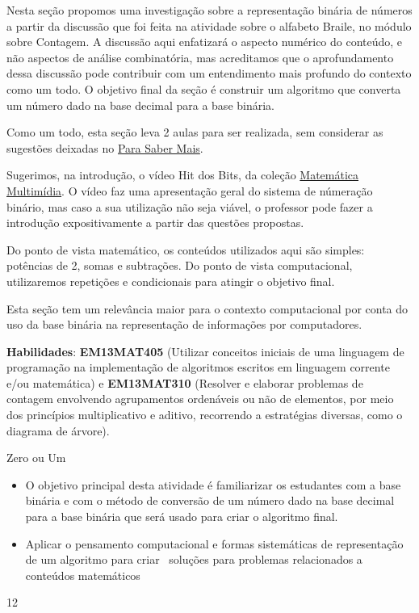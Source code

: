 \def\currentcolor{session1}
\begin{texto}
{
Nesta seção propomos uma investigação sobre a representação binária de números a partir da discussão que foi feita na atividade sobre o alfabeto Braile, no módulo sobre Contagem. A discussão aqui enfatizará o aspecto numérico do conteúdo, e não aspectos de análise combinatória, mas acreditamos que o aprofundamento dessa discussão pode contribuir com um entendimento mais profundo do contexto como um todo. O objetivo final da seção é construir um algoritmo que converta um número dado na base decimal para a base binária.

Como um todo, esta seção leva 2 aulas para ser realizada, sem considerar as sugestões deixadas no \hyperref[comp-know1]{Para Saber Mais}.

Sugerimos, na introdução, o vídeo Hit dos Bits, da coleção \href{https://m3.ime.unicamp.br/}{Matemática Multimídia}. O vídeo faz uma apresentação geral do sistema de númeração binário, mas caso a sua utilização não seja viável, o professor pode fazer a introdução expositivamente a partir das questões propostas.

Do ponto de vista matemático, os conteúdos utilizados aqui são simples: potências de 2, somas e subtrações. Do ponto de vista computacional, utilizaremos repetições e condicionais para atingir o objetivo final.

Esta seção tem um relevância maior para o contexto computacional por conta do uso da base binária na representação de informações por computadores.

\textbf{Habilidades}: \textbf{EM13MAT405} (Utilizar conceitos iniciais de uma linguagem de programação na implementação de algoritmos escritos em linguagem corrente e/ou matemática) e \textbf{EM13MAT310} (Resolver e elaborar problemas de contagem envolvendo agrupamentos ordenáveis ou não de elementos, por meio dos princípios multiplicativo e aditivo, recorrendo a estratégias diversas, como o diagrama de árvore).

}
\end{texto}
\clearmargin
\begin{objectives}{Zero ou Um}
{
\begin{itemize}
\item O objetivo principal desta atividade é familiarizar os estudantes com a base binária e com o método de conversão de um número dado na base decimal para a base binária que será usado para criar o algoritmo final.

\item Aplicar o pensamento computacional e formas sistemáticas de representação de um algoritmo para criar ~soluções para problemas relacionados a conteúdos matemáticos
\end{itemize}
}{1}{2}
\end{objectives}
